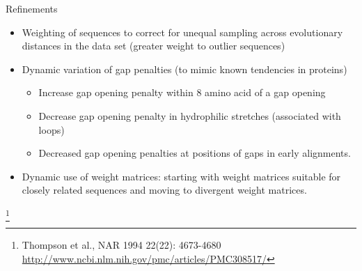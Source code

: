 \documentclass[pdf]{beamer}
\newcommand\blfootnote[1]{%
  \begingroup  %
  \renewcommand\thefootnote{}\footnote{#1}%
  \addtocounter{footnote}{-1}  %
  \endgroup
}
\begin{document}
{\begin{frame}{Refinements}
  \small
  \begin{itemize}
  \item Weighting of sequences to correct for unequal sampling across
    evolutionary distances in the data set (greater weight to outlier sequences)
  \item Dynamic variation of gap penalties (to mimic known tendencies in
    proteins)
    \begin{itemize}
    \item Increase gap opening penalty within 8 amino acid of a gap opening
    \item Decrease gap opening penalty in hydrophilic stretches (associated
      with loops)
    \item Decreased gap opening penalties at positions of gaps in early
      alignments.
    \end{itemize}
  \item Dynamic use of weight matrices: starting with weight matrices suitable
    for closely related sequences and moving to divergent weight matrices.
  \end{itemize}
  \blfootnote{Thompson et al., NAR 1994 22(22): 4673-4680\\
    \url{http://www.ncbi.nlm.nih.gov/pmc/articles/PMC308517/}
  }
\end{frame}

}
\end{document}

